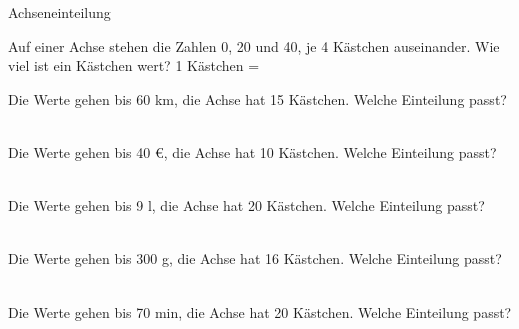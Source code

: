 \begin{aufgabe}{Achseneinteilung}
\begin{teile}
\teil Auf einer Achse stehen die Zahlen 0, 20 und 40, je 4 Kästchen auseinander. Wie viel ist ein Kästchen wert? 1 Kästchen = \leerfeld
\end{teile}
\begin{teile}
\teil Die Werte gehen bis 60 km, die Achse hat 15 Kästchen. Welche Einteilung passt? \\  \\ 
\end{teile}
\begin{teile}
\teil Die Werte gehen bis 40 €, die Achse hat 10 Kästchen. Welche Einteilung passt? \\  \\ 
\end{teile}
\begin{teile}
\teil Die Werte gehen bis 9 l, die Achse hat 20 Kästchen. Welche Einteilung passt? \\  \\ 
\end{teile}
\begin{teile}
\teil Die Werte gehen bis 300 g, die Achse hat 16 Kästchen. Welche Einteilung passt? \\  \\ 
\end{teile}
\begin{teile}
\teil Die Werte gehen bis 70 min, die Achse hat 20 Kästchen. Welche Einteilung passt? \\  \\ 
\end{teile}

\end{aufgabe}
